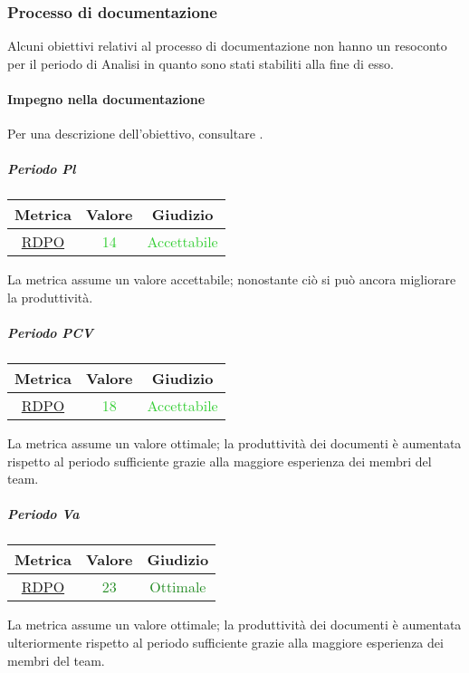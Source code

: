 		\subsubsection{Processo di documentazione}
			Alcuni obiettivi relativi al processo di documentazione non hanno un resoconto per il periodo di Analisi in quanto sono stati stabiliti alla fine di esso.
			
			\paragraph{Impegno nella documentazione}
				Per una descrizione dell'obiettivo, consultare .
				\subparagraph{Periodo Pl}
				\begin{table}[H]
					\centering
					\begin{tabular}{  c | c | c}
						\hline
						\textbf{Metrica} & \textbf{Valore} & \textbf{Giudizio} \\
						\hline
						 \hyperref[MMC]{RDPO}   & \textcolor{LimeGreen}{14}          & \textcolor{LimeGreen}{Accettabile} \\ \hline
					\end{tabular}
				\end{table}
					La metrica assume un valore accettabile; nonostante ciò si può ancora migliorare la produttività.
					
					\subparagraph{Periodo PCV}
					\begin{table}[H]
						\centering
						\begin{tabular}{  c | c | c}
							\hline
							\textbf{Metrica} & \textbf{Valore} & \textbf{Giudizio} \\
							\hline
							\hyperref[MMC]{RDPO}   & \textcolor{LimeGreen}{18}          & \textcolor{LimeGreen}{Accettabile} \\ \hline
						\end{tabular}
					\end{table}
					La metrica assume un valore ottimale; la produttività dei documenti è aumentata rispetto al periodo sufficiente grazie alla maggiore esperienza dei membri del team.
					
					\subparagraph{Periodo Va}
					\begin{table}[H]
						\centering
						\begin{tabular}{  c | c | c}
							\hline
							\textbf{Metrica} & \textbf{Valore} & \textbf{Giudizio} \\
							\hline
							\hyperref[MMC]{RDPO}   & \textcolor{ForestGreen}{23}          & \textcolor{ForestGreen}{Ottimale} \\ \hline
						\end{tabular}
					\end{table}
					La metrica assume un valore ottimale; la produttività dei documenti è aumentata ulteriormente rispetto al periodo sufficiente grazie alla maggiore esperienza dei membri del team.
					
